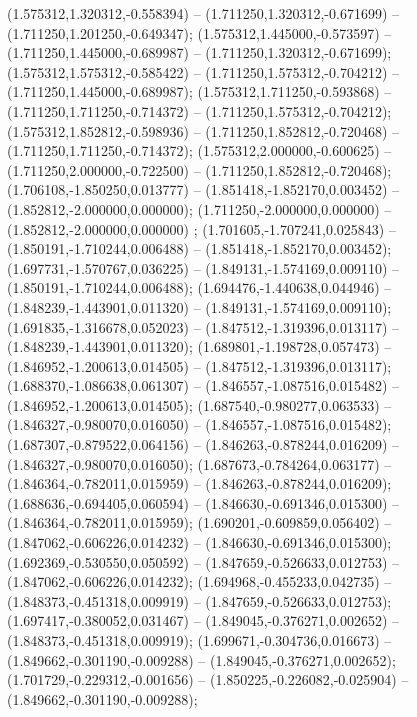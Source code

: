  (1.575312,1.320312,-0.558394) -- (1.711250,1.320312,-0.671699) -- (1.711250,1.201250,-0.649347);
 (1.575312,1.445000,-0.573597) -- (1.711250,1.445000,-0.689987) -- (1.711250,1.320312,-0.671699);
 (1.575312,1.575312,-0.585422) -- (1.711250,1.575312,-0.704212) -- (1.711250,1.445000,-0.689987);
 (1.575312,1.711250,-0.593868) -- (1.711250,1.711250,-0.714372) -- (1.711250,1.575312,-0.704212);
 (1.575312,1.852812,-0.598936) -- (1.711250,1.852812,-0.720468) -- (1.711250,1.711250,-0.714372);
 (1.575312,2.000000,-0.600625) -- (1.711250,2.000000,-0.722500) -- (1.711250,1.852812,-0.720468);
 (1.706108,-1.850250,0.013777) -- (1.851418,-1.852170,0.003452) -- (1.852812,-2.000000,0.000000);
 (1.711250,-2.000000,0.000000) -- (1.852812,-2.000000,0.000000) ;
 (1.701605,-1.707241,0.025843) -- (1.850191,-1.710244,0.006488) -- (1.851418,-1.852170,0.003452);
 (1.697731,-1.570767,0.036225) -- (1.849131,-1.574169,0.009110) -- (1.850191,-1.710244,0.006488);
 (1.694476,-1.440638,0.044946) -- (1.848239,-1.443901,0.011320) -- (1.849131,-1.574169,0.009110);
 (1.691835,-1.316678,0.052023) -- (1.847512,-1.319396,0.013117) -- (1.848239,-1.443901,0.011320);
 (1.689801,-1.198728,0.057473) -- (1.846952,-1.200613,0.014505) -- (1.847512,-1.319396,0.013117);
 (1.688370,-1.086638,0.061307) -- (1.846557,-1.087516,0.015482) -- (1.846952,-1.200613,0.014505);
 (1.687540,-0.980277,0.063533) -- (1.846327,-0.980070,0.016050) -- (1.846557,-1.087516,0.015482);
 (1.687307,-0.879522,0.064156) -- (1.846263,-0.878244,0.016209) -- (1.846327,-0.980070,0.016050);
 (1.687673,-0.784264,0.063177) -- (1.846364,-0.782011,0.015959) -- (1.846263,-0.878244,0.016209);
 (1.688636,-0.694405,0.060594) -- (1.846630,-0.691346,0.015300) -- (1.846364,-0.782011,0.015959);
 (1.690201,-0.609859,0.056402) -- (1.847062,-0.606226,0.014232) -- (1.846630,-0.691346,0.015300);
 (1.692369,-0.530550,0.050592) -- (1.847659,-0.526633,0.012753) -- (1.847062,-0.606226,0.014232);
 (1.694968,-0.455233,0.042735) -- (1.848373,-0.451318,0.009919) -- (1.847659,-0.526633,0.012753);
 (1.697417,-0.380052,0.031467) -- (1.849045,-0.376271,0.002652) -- (1.848373,-0.451318,0.009919);
 (1.699671,-0.304736,0.016673) -- (1.849662,-0.301190,-0.009288) -- (1.849045,-0.376271,0.002652);
 (1.701729,-0.229312,-0.001656) -- (1.850225,-0.226082,-0.025904) -- (1.849662,-0.301190,-0.009288);

